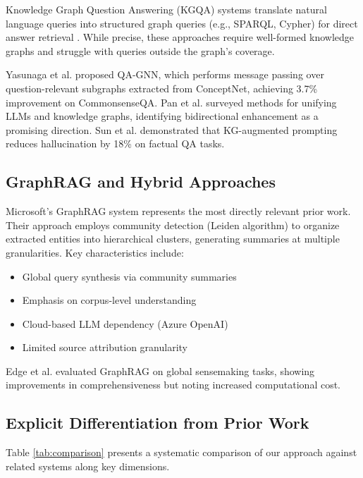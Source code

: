 \documentclass[conference]{IEEEtran}
\begin{document}
Knowledge Graph Question Answering (KGQA) systems translate natural language queries into structured graph queries (e.g., SPARQL, Cypher) for direct answer retrieval \cite{chakraborty2023survey}. While precise, these approaches require well-formed knowledge graphs and struggle with queries outside the graph's coverage.

Yasunaga et al. \cite{yasunaga2021qa} proposed QA-GNN, which performs message passing over question-relevant subgraphs extracted from ConceptNet, achieving 3.7\% improvement on CommonsenseQA. Pan et al. \cite{pan2024unifying} surveyed methods for unifying LLMs and knowledge graphs, identifying bidirectional enhancement as a promising direction. Sun et al. \cite{sun2024think} demonstrated that KG-augmented prompting reduces hallucination by 18\% on factual QA tasks.

\subsection{GraphRAG and Hybrid Approaches}

Microsoft's GraphRAG system \cite{microsoft2024graphrag} represents the most directly relevant prior work. Their approach employs community detection (Leiden algorithm) to organize extracted entities into hierarchical clusters, generating summaries at multiple granularities. Key characteristics include:

\begin{itemize}
    \item Global query synthesis via community summaries
    \item Emphasis on corpus-level understanding
    \item Cloud-based LLM dependency (Azure OpenAI)
    \item Limited source attribution granularity
\end{itemize}

Edge et al. \cite{edge2024local} evaluated GraphRAG on global sensemaking tasks, showing improvements in comprehensiveness but noting increased computational cost.

\subsection{Explicit Differentiation from Prior Work}

Table \ref{tab:comparison} presents a systematic comparison of our approach against related systems along key dimensions.
\end{document}
